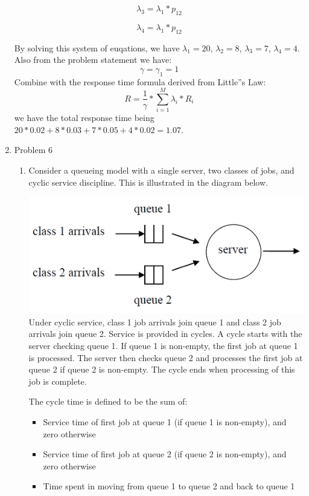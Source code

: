 \documentclass[12pt]{article}
\begin{document}
\begin{enumerate}
\begin{equation}
\lambda_3 = \lambda_1 * p_{12}
\end{equation}

\begin{equation}
\lambda_4 = \lambda_1 * p_{12}
\end{equation}

By solving this system of euqations, we have $\lambda_1 = 20$, $\lambda_2 = 8$, $\lambda_3 = 7$, $\lambda_4 = 4$. Also from the problem statement we have:
\begin{equation}
\gamma = \gamma_1 = 1
\end{equation}
Combine with the response time formula derived from Little''s Law:
\begin{equation}
R = \frac{1}{\gamma} * \sum_{i=1}^{M}{\lambda_i * R_i}
\end{equation}
we have the total response time being $20 * 0.02 + 8 * 0.03 + 7 * 0.05 + 4 * 0.02 = 1.07$.
\medskip

\item{Problem 6}

\begin{enumerate}
\item{} Consider a queueing model with a single server, two classes of jobs, and cyclic service discipline. This is illustrated in the diagram below.

\includegraphics{a1q6.png}
Under cyclic service, class 1 job arrivals join queue 1 and class 2 job arrivals join queue 2. Service is provided in cycles. A cycle starts with the server checking queue 1. If queue 1 is non-empty, the first job at queue 1 is processed. The server then checks queue 2 and processes the first job at queue 2 if queue 2 is non-empty. The cycle ends when processing of this job is complete.

The cycle time is defined to be the sum of:
\begin{itemize}
\item{} Service time of first job at queue 1 (if queue 1 is non-empty), and zero otherwise
\item{} Service time of first job at queue 2 (if queue 2 is non-empty), and zero otherwise
\item{} Time spent in moving from queue 1 to queue 2 and back to queue 1
\end{itemize}


\end{enumerate}
\end{enumerate}
\end{document}
